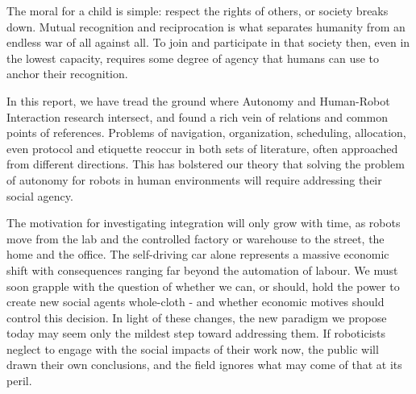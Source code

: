 \documentclass{sfuthesis}
\begin{document}
The moral for a child is simple: respect the rights of others, or society breaks down. Mutual recognition and reciprocation is what separates humanity from an endless war of all against all. To join and participate in that society then, even in the lowest capacity, requires some degree of agency that humans can use to anchor their recognition.

In this report, we have tread the ground where Autonomy and Human-Robot Interaction research intersect, and found a rich vein of relations and common points of references. Problems of navigation, organization, scheduling, allocation, even protocol and etiquette reoccur in both sets of literature, often approached from different directions. This has bolstered our theory that solving the problem of autonomy for robots in human environments will require addressing their social agency.


The motivation for investigating integration will only grow with time, as robots move from the lab and the controlled factory or warehouse to the street, the home and the office. The self-driving car alone represents a massive economic shift with consequences ranging far beyond the automation of labour. We must soon grapple with the question of whether we can, or should, hold the power to create new social agents whole-cloth - and whether economic motives should control this decision. In light of these changes, the new paradigm we propose today may seem only the mildest step toward addressing them. If roboticists neglect to engage with the social impacts of their work now, the public will drawn their own conclusions, and the field ignores what may come of that at its peril.




%
%
%
%
%

\backmatter%
	
	

\end{document}
